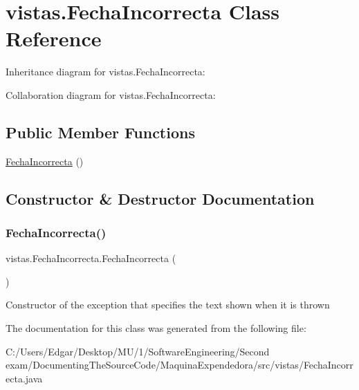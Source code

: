 \hypertarget{classvistas_1_1_fecha_incorrecta}{}\section{vistas.\+Fecha\+Incorrecta Class Reference}
\label{classvistas_1_1_fecha_incorrecta}


Inheritance diagram for vistas.\+Fecha\+Incorrecta\+:


Collaboration diagram for vistas.\+Fecha\+Incorrecta\+:
\subsection*{Public Member Functions}
\begin{DoxyCompactItemize}
\item 
\mbox{\hyperlink{classvistas_1_1_fecha_incorrecta_a665fd9b590023e898707e58c08a4b8e2}{Fecha\+Incorrecta}} ()
\end{DoxyCompactItemize}


\subsection{Constructor \& Destructor Documentation}
\mbox{\label{classvistas_1_1_fecha_incorrecta_a665fd9b590023e898707e58c08a4b8e2}} 
\subsubsection{\texorpdfstring{Fecha\+Incorrecta()}{FechaIncorrecta()}}
{\footnotesize\ttfamily vistas.\+Fecha\+Incorrecta.\+Fecha\+Incorrecta (\begin{DoxyParamCaption}{ }\end{DoxyParamCaption})\hspace{0.3cm}{\ttfamily [inline]}}

Constructor of the exception that specifies the text shown when it is thrown 

The documentation for this class was generated from the following file\+:\begin{DoxyCompactItemize}
\item 
C\+:/\+Users/\+Edgar/\+Desktop/\+M\+U/1/\+Software\+Engineering/\+Second exam/\+Documenting\+The\+Source\+Code/\+Maquina\+Expendedora/src/vistas/Fecha\+Incorrecta.\+java\end{DoxyCompactItemize}
